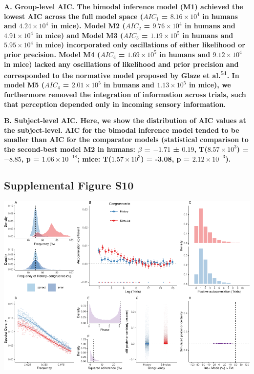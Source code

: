 \documentclass[
]{article}
\begin{document}
\textbf{A. Group-level AIC. The bimodal inference model (M1) achieved
the lowest AIC across the full model space (\(AIC_1\) =
\(\ensuremath{8.16\times 10^{4}}\) in humans and
\(\ensuremath{4.24\times 10^{4}}\) in mice). Model M2 (\(AIC_2\) =
\(\ensuremath{9.76\times 10^{4}}\) in humans and
\(\ensuremath{4.91\times 10^{4}}\) in mice) and Model M3 (\(AIC_3\) =
\(\ensuremath{1.19\times 10^{5}}\) in humans and
\(\ensuremath{5.95\times 10^{4}}\) in mice) incorporated only
oscillations of either likelihood or prior precision. Model M4
(\(AIC_4\) = \(\ensuremath{1.69\times 10^{5}}\) in humans and
\(\ensuremath{9.12\times 10^{4}}\) in mice) lacked any oscillations of
likelihood and prior precision and corresponded to the normative model
proposed by Glaze et al.\textsuperscript{51}. In model M5 (\(AIC_4\) =
\(\ensuremath{2.01\times 10^{5}}\) in humans and
\(\ensuremath{1.13\times 10^{5}}\) in mice), we furthermore removed the
integration of information across trials, such that perception depended
only in incoming sensory information.}

\textbf{B. Subject-level AIC. Here, we show the distribution of AIC
values at the subject-level. AIC for the bimodal inference model tended
to be smaller than AIC for the comparator models (statistical comparison
to the second-best model M2 in humans: \(\beta\) = \(-1.71\) ± \(0.19\),
T(\(\ensuremath{8.57\times 10^{3}}\)) = \(-8.85\), p =
\(\ensuremath{1.06\times 10^{-18}}\); mice:
T(\(\ensuremath{1.57\times 10^{3}}\)) = -3.08, p =
\(\ensuremath{2.12\times 10^{-3}}\)).}

\newpage

\hypertarget{supplemental-figure-s10}{%
\subsection{Supplemental Figure S10}\label{supplemental-figure-s10}}

\includegraphics{modes_mouse_rev1b_files/figure-latex/Supplemental_Figure_S10-1.pdf}
\end{document}

